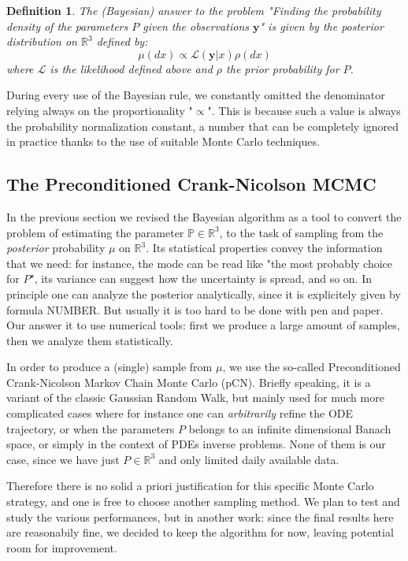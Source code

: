 \documentclass[8pt]{article}
\newtheorem{definition}{Definition}
\begin{document}
\begin{definition}
	The (Bayesian)
	answer to the problem "Finding the probability density of
	the parameters $P$ given the observations $\textbf{y}$"
	is given by the \emph{posterior}
	distribution on $\mathbb{R}^{3}$ defined by:
	\begin{equation}
		\mu(dx) \propto \mathcal{L}(\textbf{y} | x) \rho(dx)
	\end{equation}
	where $\mathcal{L}$ is the likelihood defined above
	and $\rho$ the prior probability for $P$.
\end{definition}


During every use of the Bayesian rule, we constantly omitted the denominator
relying always on the proportionality "$\propto$". 
This is because such a value is always the probability 
normalization constant,
a number that can be completely ignored in practice thanks to the use
of suitable Monte Carlo techniques.


\subsection{The Preconditioned Crank-Nicolson MCMC}
In the previous section we revised the Bayesian algorithm
as a tool to convert the problem of
estimating the parameter $\mathbb{P} \in \mathbb{R}^3$, to the task
of sampling from the \emph{posterior} probability $\mu$ on $\mathbb{R}^3$.
Its statistical properties convey the information that we need:
for instance, the mode can be read like "the most probably
choice for $P$", its variance can suggest how the uncertainty
is spread, and so on.
In principle one can analyze the posterior analytically,
since it is explicitely given by formula NUMBER.
But usually it is too hard to be done with pen and paper.
Our answer it to use numerical tools: first we
produce a large amount of samples, then we analyze them
statistically.


In order to produce a (single) sample from $\mu$,
we use the so-called Preconditioned
Crank-Nicolson Markov Chain Monte Carlo (pCN).
Briefly speaking, it is a variant of the classic
Gaussian Random Walk, but mainly used for much more complicated cases
where for instance one can \emph{arbitrarily} refine the ODE
trajectory, or when the parameters $P$ belongs to 
an infinite dimensional Banach space, or simply in the context of
PDEs inverse problems.
None of them is our case, since we have just $P \in \mathbb{R}^3$ and
only limited daily available data.


Therefore there is no solid a priori justification for this specific 
Monte Carlo strategy, and one is free to choose another sampling method.
We plan to test and study the various performances, but in another work:
since the final results here are reasonabily fine, we decided
to keep the algorithm for now, leaving potential room for improvement.
\end{document}
